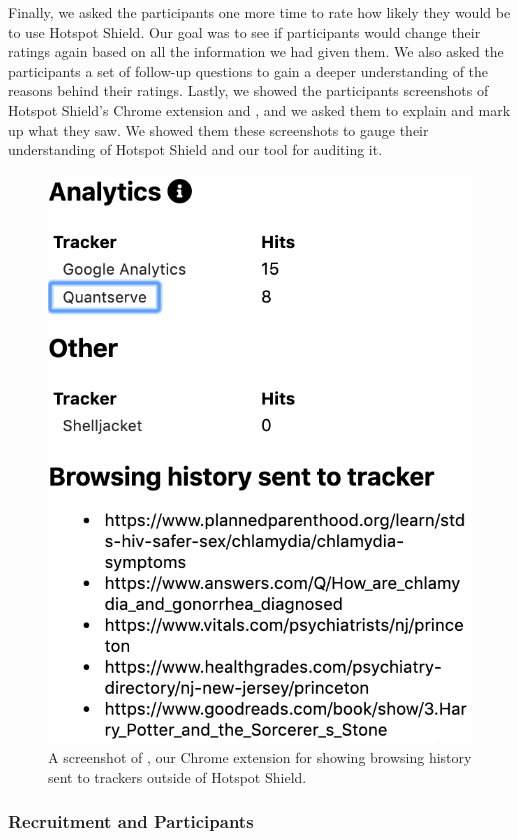 Finally, we asked the participants one more time to rate how likely they would
be to use Hotspot Shield.  Our goal was to see if participants would change
their ratings again based on all the information we had given them.  We also
asked the participants a set of follow-up questions to gain a deeper
understanding of the reasons behind their ratings.  Lastly, we showed the
participants screenshots of Hotspot Shield's Chrome extension and \tool,
and we asked them to explain and mark up what they saw.  We showed them these
screenshots to gauge their understanding of Hotspot Shield and our tool for
auditing it.

\begin{figure}[t]
    \includegraphics[width=0.85\linewidth]{sections/figures/vpn-audit.png}
    \caption{A screenshot of \tool, our Chrome extension for showing browsing history sent to trackers outside of Hotspot Shield.}
    \label{fig:vpn-audit}
\end{figure}

\subsubsection{Recruitment and Participants} 

